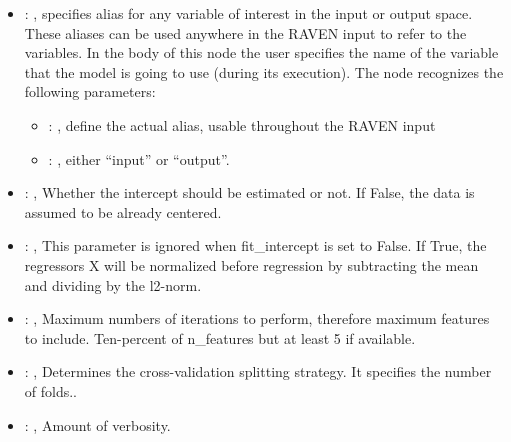 \begin{itemize}
    \item {}: , 
      specifies alias for         any variable of interest in the input or output space. These
      aliases can be used anywhere in the RAVEN input to         refer to the variables. In the body
      of this node the user specifies the name of the variable that the model is going to use
      (during its execution).
      The  node recognizes the following parameters:
        \begin{itemize}
          \item {}: , 
            define the actual alias, usable throughout the RAVEN input
          \item {}: , 
            either ``input'' or ``output''.
      \end{itemize}

    \item {}: , 
      Whether the intercept should be estimated or not. If False,
      the data is assumed to be already centered.

    \item {}: , 
      This parameter is ignored when fit\_intercept is set to False. If True,
      the regressors X will be normalized before regression by subtracting the mean and
      dividing by the l2-norm.

    \item {}: , 
      Maximum numbers of iterations to perform, therefore maximum
      features to include. Ten-percent of n\_features but at least 5 if available.

    \item {}: , 
      Determines the cross-validation splitting strategy.
      It specifies the number of folds..

    \item {}: , 
      Amount of verbosity.
  \end{itemize}


